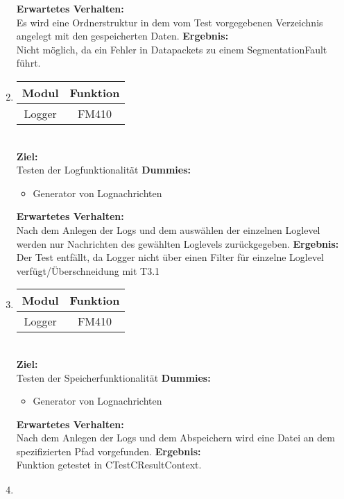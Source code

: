 \begin{enumerate}[align=left, leftmargin=4em, label={\textbf{\textbackslash T2.\arabic*\textbackslash}} ]
\begin{itemize}
		\end{itemize}
		\subitem \textbf{Erwartetes Verhalten:}\\
		Es wird eine Ordnerstruktur in dem vom Test vorgegebenen Verzeichnis angelegt mit den gespeicherten Daten.
		\subitem \textbf{Ergebnis:}\\
		Nicht möglich, da ein Fehler in Datapackets zu einem SegmentationFault führt.
		\\\item \begin{tabular}{|c|c|}
			\hline Modul & Funktion \\
			\hline Logger & FM410 \\
			\hline
		\end{tabular}\\
		\subitem \textbf{Ziel:} \\ Testen der Logfunktionalität
		\subitem \textbf{Dummies:} \begin{itemize}
			\item Generator von Lognachrichten
		\end{itemize}
		\subitem \textbf{Erwartetes Verhalten:}\\
		Nach dem Anlegen der Logs und dem auswählen der einzelnen Loglevel werden nur Nachrichten des gewählten Loglevels zurückgegeben.
		\subitem \textbf{Ergebnis:}\\
		Der Test entfällt, da Logger nicht über einen Filter für einzelne Loglevel verfügt/Überschneidung mit T3.1
		\\\item \begin{tabular}{|c|c|}
			\hline Modul & Funktion \\
			\hline Logger & FM410 \\
			\hline
		\end{tabular}\\
		\subitem \textbf{Ziel:} \\ Testen der Speicherfunktionalität
		\subitem \textbf{Dummies:} \begin{itemize}
			\item Generator von Lognachrichten
		\end{itemize}
		\subitem \textbf{Erwartetes Verhalten:}\\
		Nach dem Anlegen der Logs und dem Abspeichern wird eine Datei an dem spezifizierten Pfad vorgefunden.
		\subitem \textbf{Ergebnis:}\\
		Funktion getestet in CTestCResultContext.
		\\\item \begin{tabular}{|c|c|}

\end{tabular}
\end{enumerate}
